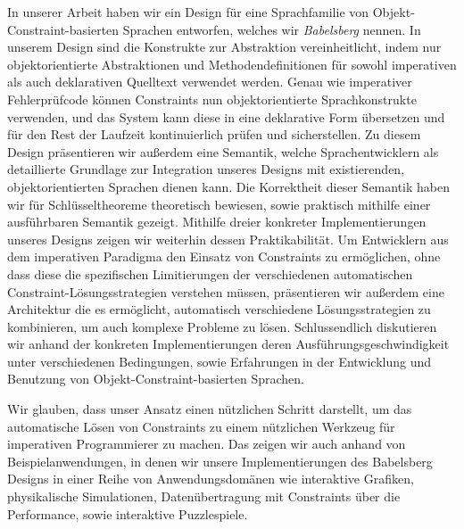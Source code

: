 \begin{sloppypar}
  In unserer Arbeit haben wir ein Design für eine Sprachfamilie von
  Objekt-Constraint-basierten Sprachen entworfen, welches wir \emph{Babelsberg}
  nennen. In unserem Design sind die Konstrukte zur Abstraktion vereinheitlicht,
  indem nur objektorientierte Abstraktionen und Methodendefinitionen für sowohl
  imperativen als auch deklarativen Quelltext verwendet werden. Genau wie
  imperativer Fehlerprüfcode können Constraints nun objektorientierte
  Sprachkonstrukte verwenden, und das System kann diese in eine deklarative Form
  übersetzen und für den Rest der Laufzeit kontinuierlich prüfen und
  sicherstellen. Zu diesem Design präsentieren wir außerdem eine Semantik,
  welche Sprachentwicklern als detaillierte Grundlage zur Integration unseres
  Designs mit existierenden, objektorientierten Sprachen dienen kann. Die
  Korrektheit dieser Semantik haben wir für Schlüsseltheoreme theoretisch
  bewiesen, sowie praktisch mithilfe einer ausführbaren Semantik
  gezeigt. Mithilfe dreier konkreter Implementierungen unseres Designs zeigen
  wir weiterhin dessen Praktikabilität. Um Entwicklern aus dem imperativen
  Paradigma den Einsatz von Constraints zu ermöglichen, ohne dass diese die
  spezifischen Limitierungen der verschiedenen automatischen
  Constraint-Lösungsstrategien verstehen müssen, präsentieren wir außerdem eine
  Architektur die es ermöglicht, automatisch verschiedene Lösungsstrategien zu
  kombinieren, um auch komplexe Probleme zu lösen. Schlussendlich diskutieren
  wir anhand der konkreten Implementierungen deren Ausführungsgeschwindigkeit
  unter verschiedenen Bedingungen, sowie Erfahrungen in der Entwicklung und
  Benutzung von Objekt-Constraint-basierten Sprachen.
\end{sloppypar}

Wir glauben, dass unser Ansatz einen nützlichen Schritt darstellt, um das
automatische Lösen von Constraints zu einem nützlichen Werkzeug für imperativen
Programmierer zu machen. Das zeigen wir auch anhand von Beispielanwendungen, in
denen wir unsere Implementierungen des Babelsberg Designs in einer Reihe von
Anwendungsdomänen wie interaktive Grafiken, physikalische Simulationen,
Datenübertragung mit Constraints über die Performance, sowie interaktive
Puzzlespiele.

